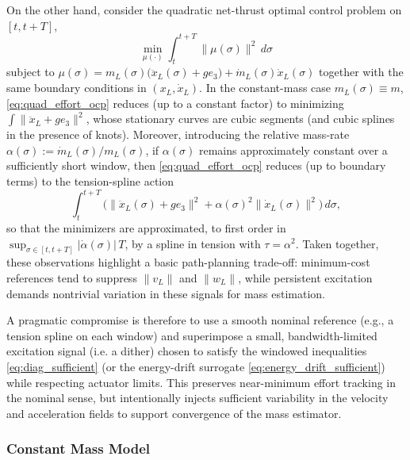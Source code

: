\documentclass[letterpaper, 10 pt, conference]{ieeeconf}  %
\begin{document}
On the other hand, consider the quadratic net-thrust optimal control problem on $[t,t+T]$,
\begin{equation}\label{eq:quad_effort_ocp}
\min_{\mu(\cdot)}\int_t^{t+T}\|\mu(\sigma)\|^2\,d\sigma 
\end{equation} subject to $\mu(\sigma)=m_L(\sigma)\big(\ddot x_L(\sigma)+ge_3\big)+\dot m_L(\sigma)\dot x_L(\sigma)$
together with the same boundary conditions in $(x_L,\dot x_L)$.
In the constant-mass case $m_L(\sigma)\equiv m$, \eqref{eq:quad_effort_ocp} reduces (up to a
constant factor) to minimizing $\int\|\ddot x_L+ge_3\|^2$, whose stationary curves are cubic segments (and cubic splines in the presence of knots).
Moreover, introducing the relative mass-rate $\alpha(\sigma):=\dot m_L(\sigma)/m_L(\sigma)$,
if $\alpha(\sigma)$ remains approximately constant over a sufficiently short window, then
\eqref{eq:quad_effort_ocp} reduces (up to boundary terms) to the tension-spline action
\[
\int_t^{t+T}\Big(\|\ddot x_L(\sigma)+ge_3\|^2+\alpha(\sigma)^2\|\dot x_L(\sigma)\|^2\Big)\,d\sigma,
\]
so that the minimizers are approximated, to first order in $\sup_{\sigma\in[t,t+T]}|\dot\alpha(\sigma)|\,T$,
by a spline in tension with $\tau=\alpha^2$.
Taken together, these observations highlight a basic path-planning trade-off:
minimum-cost references tend to suppress $\|v_L\|$ and $\|w_L\|$, while persistent excitation
demands nontrivial variation in these signals for mass estimation.

A pragmatic compromise is therefore to use a smooth nominal reference (e.g., a tension spline on each window) and superimpose a small, bandwidth-limited excitation signal (i.e. a dither) chosen to satisfy the windowed inequalities \eqref{eq:diag_sufficient} (or the energy-drift surrogate \eqref{eq:energy_drift_sufficient}) while respecting actuator limits. This preserves near-minimum effort tracking in the nominal sense, but intentionally injects sufficient variability in the velocity and acceleration fields to support convergence of the mass estimator.

\subsubsection{Constant Mass Model}
\end{document}
